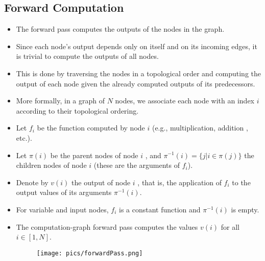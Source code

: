 \subsection{Forward Computation}
\begin{itemize}

\item  The forward pass computes the outputs of the nodes in the graph. \item Since each node's output depends only on itself and on its incoming edges, it is trivial to compute the outputs of all nodes.

\item This is done by traversing the nodes in a topological order and computing the output of each node given the already computed outputs of its predecessors.

\item  More formally, in a graph of $N$ nodes, we associate each node with an index $i$ according to their topological ordering.

\item Let $f_i$ be the function computed by node $i$ (e.g., multiplication,
addition , etc.).

\item Let $\pi(i)$ be the parent nodes of node $i$ , and $\pi^{-1}(i) = \{j| i \in \pi(j) \}$ the children nodes of node $i$ (these are the arguments of $f_i$).

\item Denote by $v(i)$  the output of node $i$ , that is, the application of $f_i$ to the output values of its arguments $\pi^{-1}(i)$. 

\item For variable and input nodes, $f_i$ is a constant function and $\pi^{-1}(i)$ is empty. 

\item The computation-graph forward pass computes the values $v(i)$ for all $i \in [1,N]$.

 \begin{figure}[htb]
	\centering
	 \texttt{[image: pics/forwardPass.png]}
\end{figure}

\end{itemize}



